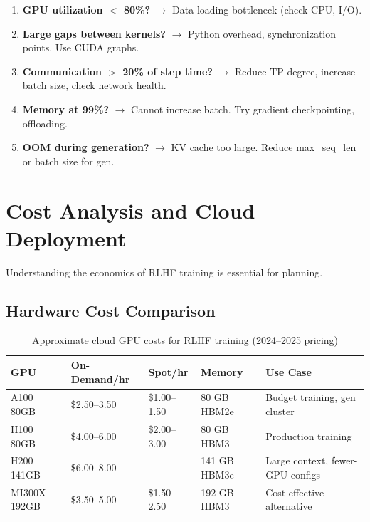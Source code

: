 \begin{examplebox}
\begin{enumerate}
  \item \textbf{GPU utilization $<$ 80\%?} $\rightarrow$ Data loading bottleneck (check CPU, I/O).
  \item \textbf{Large gaps between kernels?} $\rightarrow$ Python overhead, synchronization points. Use CUDA graphs.
  \item \textbf{Communication $>$ 20\% of step time?} $\rightarrow$ Reduce TP degree, increase batch size, check network health.
  \item \textbf{Memory at 99\%?} $\rightarrow$ Cannot increase batch. Try gradient checkpointing, offloading.
  \item \textbf{OOM during generation?} $\rightarrow$ KV cache too large. Reduce max\_seq\_len or batch size for gen.
\end{enumerate}
\end{examplebox}

\section{Cost Analysis and Cloud Deployment}
\label{cost-analysis-and-cloud-deployment}

Understanding the economics of RLHF training is essential for planning.

\subsection{Hardware Cost Comparison}
\label{hardware-cost-comparison}

\begin{table}[ht!]
\centering
\caption{Approximate cloud GPU costs for RLHF training (2024--2025 pricing)}
\begin{tabular}{@{}lp{3cm}p{3.2cm}p{3.2cm}p{3.5cm}@{}}
\toprule
\textbf{GPU} & \textbf{On-Demand/hr} & \textbf{Spot/hr} & \textbf{Memory} & \textbf{Use Case} \\
\midrule
A100 80GB & \$2.50--3.50 & \$1.00--1.50 & 80 GB HBM2e & Budget training, gen cluster \\
H100 80GB & \$4.00--6.00 & \$2.00--3.00 & 80 GB HBM3 & Production training \\
H200 141GB & \$6.00--8.00 & --- & 141 GB HBM3e & Large context, fewer-GPU configs \\
MI300X 192GB & \$3.50--5.00 & \$1.50--2.50 & 192 GB HBM3 & Cost-effective alternative \\
\bottomrule
\end{tabular}
\end{table}

